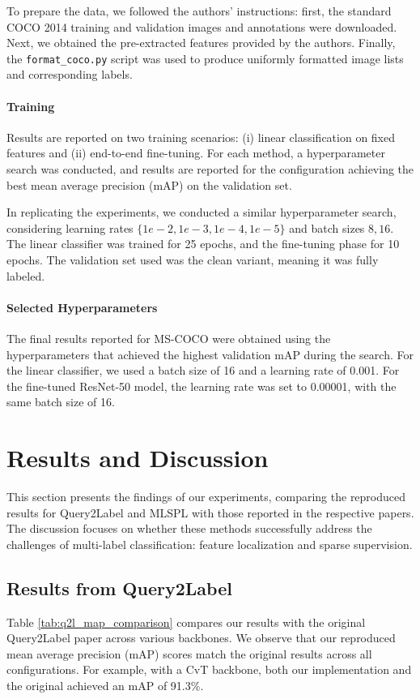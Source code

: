 \documentclass[lettersize,journal]{IEEEtran}
\begin{document}
To prepare the data, we followed the authors' instructions: first, the standard COCO 2014 training and validation images and annotations were downloaded. Next, we obtained the pre-extracted features provided by the authors. Finally, the \texttt{format\_coco.py} script was used to produce uniformly formatted image lists and corresponding labels.


\paragraph{Training}
Results are reported on two training scenarios: (i) linear classification on fixed features and (ii) end-to-end fine-tuning. For each method, a hyperparameter search was conducted, and results are reported for the configuration achieving the best mean average precision (mAP) on the validation set.

In replicating the experiments, we conducted a similar hyperparameter search, considering learning rates  $\{1e-2, 1e-3, 1e-4, 1e-5\}$ and batch sizes ${8, 16}$. The linear classifier was trained for 25 epochs, and the fine-tuning phase for 10 epochs. The validation set used was the clean variant, meaning it was fully labeled.

\paragraph{Selected Hyperparameters}
The final results reported for MS-COCO were obtained using the hyperparameters that achieved the highest validation mAP during the search. For the linear classifier, we used a batch size of 16 and a learning rate of 0.001. For the fine-tuned ResNet-50 model, the learning rate was set to 0.00001, with the same batch size of 16.


\section{Results and Discussion}
\label{sec:results}
This section presents the findings of our experiments, comparing the reproduced results for Query2Label and MLSPL with those reported in the respective papers. The discussion focuses on whether these methods successfully address the challenges of multi-label classification: feature localization and sparse supervision.


\subsection{Results from Query2Label}
Table \ref{tab:q2l_map_comparison} compares our results with the original Query2Label paper across various backbones. We observe that our reproduced mean average precision (mAP) scores match the original results across all configurations. For example, with a CvT backbone, both our implementation and the original achieved an mAP of 91.3\%.
\end{document}
